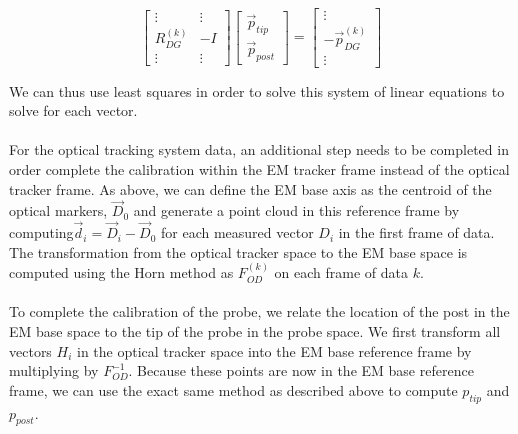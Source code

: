 \documentclass[letterpaper, 11pt]{report}
\begin{document}
$$\begin{bmatrix}
		\vdots & \vdots \\
    	R_{DG}^{(k)} & -I\\
        \vdots & \vdots
    \end{bmatrix}\begin{bmatrix}
    					\vec p_{tip} \\
                        \vec p_{post}
                   \end{bmatrix} = \begin{bmatrix}
                   						\vdots \\
                                        -\vec p_{DG}^{(k)} \\
                                        \vdots
                                    \end{bmatrix}$$
                                    
We can thus use least squares in order to solve this system of linear equations to solve for each vector.
\\
\\
For the optical tracking system data, an additional step needs to be completed in order complete the calibration within the EM tracker frame instead of the optical tracker frame. As above, we can define the EM base axis as the centroid of the optical markers, $\vec D_0$ and generate a point cloud in this reference frame by computing$\vec d_i = \vec D_i - \vec D_0$ for each measured vector $D_i$ in the first frame of data. The transformation from the optical tracker space to the EM base space is computed using the Horn method as $F_{OD}^{(k)}$ on each frame of data $k$.
\\
\\
To complete the calibration of the probe, we relate the location of the post in the EM base space to the tip of the probe in the probe space. We first transform all vectors $H_i$ in the optical tracker space into the EM base reference frame by multiplying by $F_{OD}^{-1}$. Because these points are now in the EM base reference frame, we can use the exact same method as described above to compute $p_{tip}$ and $p_{post}$.
\end{document}
